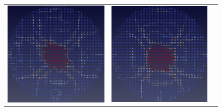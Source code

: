 \begin{figure}
  \centering
  \begin{tabular}{ccc}
  \includegraphics[scale=0.3]{figure/Solutions/solution_200.eps} &
  \includegraphics[scale=0.3]{figure/Solutions/solution_201.eps} &

\end{tabular}
\end{figure}
